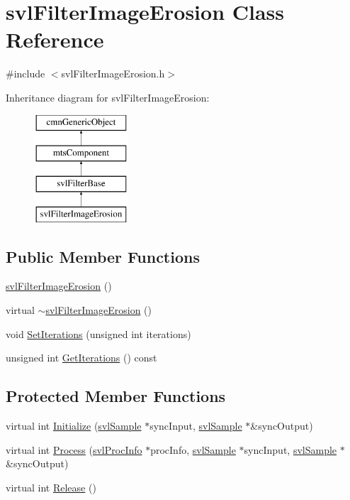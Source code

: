 \hypertarget{classsvl_filter_image_erosion}{}\section{svl\+Filter\+Image\+Erosion Class Reference}
\label{classsvl_filter_image_erosion}


{\ttfamily \#include $<$svl\+Filter\+Image\+Erosion.\+h$>$}

Inheritance diagram for svl\+Filter\+Image\+Erosion\+:\begin{figure}[H]
\begin{center}
\leavevmode
\includegraphics[height=4.000000cm]{db/deb/classsvl_filter_image_erosion}
\end{center}
\end{figure}
\subsection*{Public Member Functions}
\begin{DoxyCompactItemize}
\item 
\hyperlink{classsvl_filter_image_erosion_abc9792f6d44fc0ec36e6317603807312}{svl\+Filter\+Image\+Erosion} ()
\item 
virtual \hyperlink{classsvl_filter_image_erosion_a5c18d9495fed1dfbb89da4b3153a14a0}{$\sim$svl\+Filter\+Image\+Erosion} ()
\item 
void \hyperlink{classsvl_filter_image_erosion_abfa6704f2f20c26fa2a3d25ad4ab4419}{Set\+Iterations} (unsigned int iterations)
\item 
unsigned int \hyperlink{classsvl_filter_image_erosion_a86d06c67a57ed50824ff822cf7492d49}{Get\+Iterations} () const 
\end{DoxyCompactItemize}
\subsection*{Protected Member Functions}
\begin{DoxyCompactItemize}
\item 
virtual int \hyperlink{classsvl_filter_image_erosion_a08091734a866f286a61e3ba88ac4c71f}{Initialize} (\hyperlink{classsvl_sample}{svl\+Sample} $\ast$sync\+Input, \hyperlink{classsvl_sample}{svl\+Sample} $\ast$\&sync\+Output)
\item 
virtual int \hyperlink{classsvl_filter_image_erosion_a44f746adfed22667139bc29f42bf31f9}{Process} (\hyperlink{structsvl_proc_info}{svl\+Proc\+Info} $\ast$proc\+Info, \hyperlink{classsvl_sample}{svl\+Sample} $\ast$sync\+Input, \hyperlink{classsvl_sample}{svl\+Sample} $\ast$\&sync\+Output)
\item 
virtual int \hyperlink{classsvl_filter_image_erosion_ad7bfd03de5fe3d8ebc9c4f934e86b4b0}{Release} ()
\end{DoxyCompactItemize}
